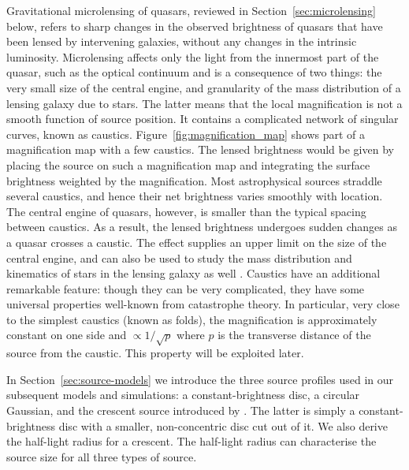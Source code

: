 \documentclass[usenatbib]{mn2e}
\begin{document}
Gravitational microlensing of quasars, reviewed in
Section~\ref{sec:microlensing} below, refers to sharp changes in the
observed brightness of quasars that have been lensed by intervening
galaxies, without any changes in the intrinsic luminosity.
Microlensing affects only the light from the innermost part of the
quasar, such as the optical continuum
\citep[e.g.,][]{2012A&A...544A..62S} and is a consequence of two
things: the very small size of the central engine, and granularity of
the mass distribution of a lensing galaxy due to stars.  The latter
means that the local magnification is not a smooth function of source
position. It contains a complicated network of singular curves, known
as caustics.  Figure~\ref{fig:magnification_map} shows part of a
magnification map with a few caustics.  The lensed brightness would be
given by placing the source on such a magnification map and
integrating the surface brightness weighted by the magnification.
Most astrophysical sources straddle several caustics, and hence their
net brightness varies smoothly with location.  The central engine of
quasars, however, is smaller than the typical spacing between
caustics.  As a result, the lensed brightness undergoes sudden changes
as a quasar crosses a caustic.  The effect supplies an upper limit on
the size of the central engine, and can also be used to study the mass
distribution and kinematics of stars in the lensing galaxy as well
\citep[e.g.,][]{2012ApJ...744..111P}.  Caustics have an additional
remarkable feature: though they can be very complicated, they have
some universal properties well-known from catastrophe theory.  In
particular, very close to the simplest caustics (known as folds), the
magnification is approximately constant on one side and
$\propto1/\sqrt p$ where $p$ is the transverse distance of the source
from the caustic.  This property will be exploited later.

In Section~\ref{sec:source-models} we introduce the three source
profiles used in our subsequent models and simulations: a
constant-brightness disc, a circular Gaussian, and the crescent source
introduced by \citep{2013MNRAS.434..765K}.  The latter is simply a
constant-brightness disc with a smaller, non-concentric disc cut out
of it.  We also derive the half-light radius for a crescent.  The
half-light radius can characterise the source size for all three types
of source.
\end{document}
